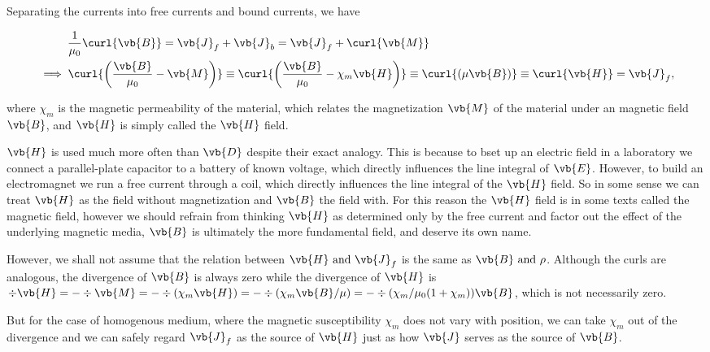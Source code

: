 \documentclass[english,a4paper,12pt]{report}
\begin{document}
Separating the currents into free currents and bound currents, we have

\begin{equation}
    \begin{aligned} 
    &~~~~~~~~ \frac{1}{\mu_0 } \curl{\vb{B} } = \vb{J} _{f} + \vb{J} _{b} = \vb{J} _{f} + \curl{\vb{M} } \\
    & \implies  \curl{\left(\frac{\vb{B} }{\mu_0 } - \vb{M}  \right)} \equiv \curl{\left(\frac{\vb{B} }{\mu_0 } - \chi _{m}\vb{H}  \right)} \equiv  \curl{(\mu \vb{B}) } \equiv \curl{\vb{H} } = \vb{J} _{f},  
    \end{aligned}         
\end{equation}

where \(\chi _{m} \) is the magnetic permeability of the material, which relates the magnetization \(\vb{M} \) of the material under an magnetic field \(\vb{B} \), and \(\vb{H} \) is simply called the \(\vb{H} \) field.      

\(\vb{H} \) is used much more often than \(\vb{D} \) despite their exact analogy. This is because to bset up an electric field in a laboratory we connect a parallel-plate capacitor to a battery of known voltage, which directly influences the line integral of \(\vb{E} \). However, to build an electromagnet we run a free current through a coil, which directly influences the line integral of the \(\vb{H} \) field. So in some sense we can treat \(\vb{H} \) as the field without magnetization and \(\vb{B} \) the field with. For this reason the \(\vb{H} \) field is in some texts called the magnetic field, however we should refrain from thinking \(\vb{H} \) as determined only by the free current and factor out the effect of the underlying magnetic media, \(\vb{B} \) is ultimately the more fundamental field, and deserve its own name.       


However, we shall not assume that the relation between \(\vb{H} \text { and }  \vb{J} _{f} \) is the same as \(\vb{B} \text { and }  \rho \). Although the curls are analogous, the divergence of \(\vb{B} \) is always zero while the divergence of \(\vb{H} \) is \(\div{\vb{H} } = -\div{\vb{M} } = -\div{(\chi _{m}\vb{H} ) } = - \div{(\chi _{m}\vb{B} /\mu )   }  = -\div{(\chi _{m} /\mu_0 (1+\chi _{m} ) )\vb{B} } \), which is not necessarily zero.

But for the case of homogenous medium, where the magnetic susceptibility \(\chi _{m} \) does not vary with position, we can take \(\chi _{m} \) out of the divergence and we can safely regard \(\vb{J} _{f}\) as the source of \(\vb{H} \) just as how \(\vb{J} \) serves as the source of \(\vb{B} \).     
\end{document}
